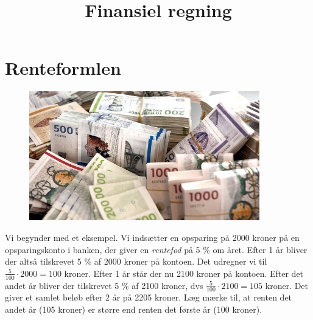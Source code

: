 \documentclass[12pt,oneside,a4paper]{article}
\title{Finansiel regning}
\date{\vspace{-5ex}}
\begin{document}
\maketitle


\section{Renteformlen}
\begin{figure}[ht]
    \centering
    \includegraphics[width=10cm]{penge}
\end{figure}

Vi begynder med et eksempel. Vi indsætter en opsparing på 2000 kroner
på en opsparingskonto i banken, der giver en \emph{rentefod} på 5 \%
om året. Efter 1 år bliver der altså tilskrevet 5 \% af 2000 kroner på kontoen. Det
udregner vi til $ \frac{5}{100} \cdot 2000 = 100$ kroner. Efter 1 år står
der nu 2100 kroner på kontoen.  Efter det andet år bliver der tilskrevet 5 \% af
2100 kroner, dvs $ \frac{5}{100} \cdot 2100 = 105$ kroner.  Det giver et samlet
beløb efter 2 år på 2205 kroner. Læg mærke til, at renten det andet år
(105 kroner) er større end renten det første år (100 kroner).
\end{document}
